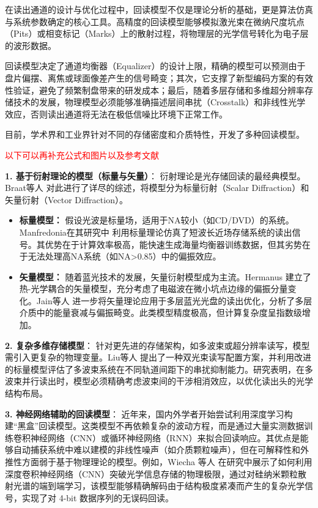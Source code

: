 在读出通道的设计与优化过程中，回读模型不仅是理论分析的基础，更是算法仿真与系统参数确定的核心工具。高精度的回读模型能够模拟激光束在微纳尺度坑点（Pits）或相变标记（Marks）上的散射过程，将物理层的光学信号转化为电子层的波形数据。

回读模型决定了通道均衡器（Equalizer）的设计上限，精确的模型可以预测由于盘片偏摆、离焦或球面像差产生的信号畸变；其次，它支撑了新型编码方案的有效性验证，避免了频繁制盘带来的研发成本；最后，随着多层存储和多维超分辨率存储技术的发展，物理模型必须能够准确描述层间串扰（Crosstalk）和非线性光学效应，否则读出通道将无法在极低信噪比环境下正常工作。

目前，学术界和工业界针对不同的存储密度和介质特性，开发了多种回读模型。

\textcolor{red}{以下可以再补充公式和图片以及参考文献}

\textbf{1. 基于衍射理论的模型（标量与矢量）}：
衍射理论是光存储回读的最经典模型。Braat等人 \cite{braat2007diffractive} 对此进行了详尽的综述，将模型分为标量衍射（Scalar Diffraction）和矢量衍射（Vector Diffraction）。
\begin{itemize}
	\item \textbf{标量模型：} 假设光波是标量场，适用于NA较小（如CD/DVD）的系统。Manfredonia在其研究中 \cite{manfredonia2007simulation} 利用标量理论仿真了短波长近场存储系统的读出信号。其优势在于计算效率极高，能快速生成海量均衡器训练数据，但其劣势在于无法处理高NA系统（如NA>0.85）中的偏振效应。
	\item \textbf{矢量模型：} 随着蓝光技术的发展，矢量衍射模型成为主流。Hermanus \cite{brusche2007mark} 建立了热-光学耦合的矢量模型，充分考虑了电磁波在微小坑点边缘的偏振分量变化。Jain等人 \cite{jain2022optimization} 进一步将矢量理论应用于多层蓝光光盘的读出优化，分析了多层介质中的能量衰减与偏振畸变。此类模型精度极高，但计算复杂度呈指数级增加。
\end{itemize}

\textbf{2. 复杂多维存储模型}：
针对更先进的存储架构，如多波束或超分辨率读写，模型需引入更复杂的物理变量。Liu等人 \cite{liu2022design} 提出了一种双光束读写配置方案，并利用改进的标量模型评估了多波束系统在不同轨道间距下的串扰抑制能力。研究表明，在多波束并行读出时，模型必须精确考虑波束间的干涉相消效应，以优化读出头的光学结构布局。

\textbf{3. 神经网络辅助的回读模型}：
近年来，国内外学者开始尝试利用深度学习构建“黑盒”回读模型。这类模型不再依赖复杂的波动方程，而是通过大量实测数据训练卷积神经网络（CNN）或循环神经网络（RNN）来拟合回读响应。其优点是能够自动捕获系统中难以建模的非线性噪声（如介质颗粒噪声），但在可解释性和外推性方面弱于基于物理理论的模型。例如，Wiecha 等人 \cite{wiecha2019pushing} 在研究中展示了如何利用深度卷积神经网络（CNN）突破光学信息存储的物理极限，通过对硅纳米颗粒散射光谱的端到端学习，该模型能够精确解码由于结构极度紧凑而产生的复杂光学信号，实现了对 4-bit 数据序列的无误码回读。

